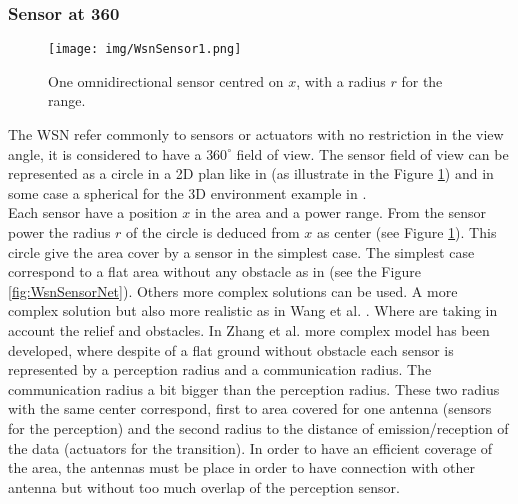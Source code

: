 \subsubsection{Sensor at 360}
%
	\begin{figure}[t!]
	\center
{}
   \texttt{[image: img/WsnSensor1.png]}
  \caption{One omnidirectional sensor centred on $x$, with a radius $r$ for the range.}\label{fig:WsnSensor1}
  \endminipage\hfill
\end{figure}

	

The WSN refer commonly to sensors or actuators  with no restriction in the view angle, it is considered to have a $360^\circ$ field of view. The sensor field of view can be represented  as a circle in a 2D plan like in \cite{200*kulkarni2011, 174*zhang2016,150*chakrabarty2002} (as illustrate in the Figure \ref{fig:WsnSensor1}) and in some case a spherical for the 3D environment example in \cite{175*medhi2013,59*wang2008}.  \\
Each sensor have a position $x$ in the area and a power range. From the sensor power  the radius $r$ of the circle is deduced from $x$ as center (see Figure \ref{fig:WsnSensor1}). This circle give the area cover by a sensor in the simplest case. 
The simplest case correspond to a flat area without any obstacle as in \cite{200*kulkarni2011,174*zhang2016} (see the Figure \ref{fig:WsnSensorNet}).  
Others more complex solutions can be used. A more complex solution but also more realistic as in Wang et al. \cite{59*wang2008}. Where are taking in account the relief and obstacles. 
In Zhang et al. \cite{174*zhang2016} more complex model has been developed, where despite of a flat ground without obstacle each sensor is represented by a perception radius and a communication radius. The communication radius a bit bigger than the perception radius. These two radius with the same center correspond, first to area covered for one antenna (sensors for the perception) and the second radius to the distance of emission/reception of the data (actuators for the transition).  In order to have an efficient coverage of the area, the antennas must be place in order to have connection with other antenna but without too much overlap of the perception sensor.\\

